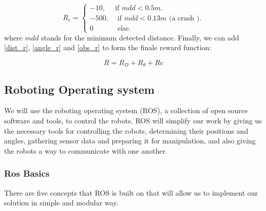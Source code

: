 \documentclass[12pt]{extarticle}
\begin{document}
\begin{equation}  \label{obs_r}
  R_{c}=\begin{cases}
    -10, & \text{if $mdd< 0.5m$}.\\
    -500 , & \text{ if $mdd <0.13m$ (a crash )}.\\
    0 & \text{ else}.
  \end{cases}
\end{equation}
where $mdd$ stands for the minimum detected distance.\linebreak
Finally, we can add \ref{dist_r}, \ref{angle_r} and \ref{obs_r} to form the finale reward function: 

 
    \begin{equation} \label{final_r}
     R=R_{D}+R_{\theta}+R{c}
   \end{equation}






\pagebreak




























\subsection{Roboting Operating system}

We will use the roboting operating system (ROS), a collection of open source software and tools, to control the robots.
ROS will simplify our work by giving us the necessary tools for controlling the robots, determining their positions and angles, gathering sensor data and preparing it for manipulation, and also giving the robots a way to communicate with one another.

\subsubsection{Ros Basics}
There are five concepts that ROS is built on that will allow us to implement our solution in  simple and modular way.
\end{document}

